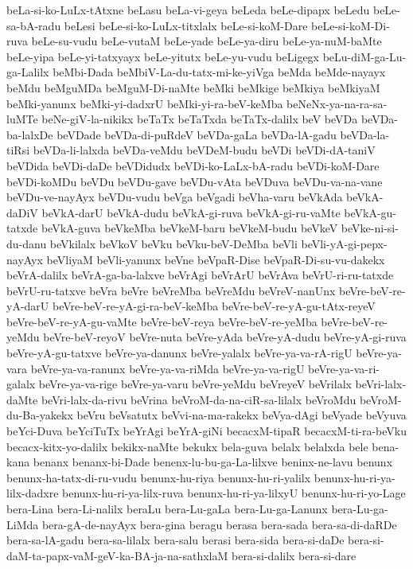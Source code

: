 {beLa-si-ko-LuLx-tAtxne
beLasu
beLa-vi-geya
beLeda
beLe-dipapx
beLedu
beLe-sa-bA-radu
beLesi
beLe-si-ko-LuLx-titxlalx
beLe-si-koM-Dare
beLe-si-koM-Di-ruva
beLe-su-vudu
beLe-vutaM
beLe-yade
beLe-ya-diru
beLe-ya-nuM-baMte
beLe-yipa
beLe-yi-tatxyayx
beLe-yitutx
beLe-yu-vudu
beLigegx
beLu-diM-ga-Lu-ga-Lalilx
beMbi-Dada
beMbiV-La-du-tatx-mi-ke-yiVga
beMda
beMde-nayayx
beMdu
beMguMDa
beMguM-Di-naMte
beMki
beMkige
beMkiya
beMkiyaM
beMki-yanunx
beMki-yi-dadxrU
beMki-yi-ra-beV-keMba
beNeNx-ya-na-ra-sa-luMTe
beNe-giV-la-nikikx
beTaTx
beTaTxda
beTaTx-dalilx
beV
beVDa
beVDa-ba-lalxDe
beVDade
beVDa-di-puRdeV
beVDa-gaLa
beVDa-lA-gadu
beVDa-la-tiRsi
beVDa-li-lalxda
beVDa-veMdu
beVDeM-budu
beVDi
beVDi-dA-taniV
beVDida
beVDi-daDe
beVDidudx
beVDi-ko-LaLx-bA-radu
beVDi-koM-Dare
beVDi-koMDu
beVDu
beVDu-gave
beVDu-vAta
beVDuva
beVDu-va-na-vane
beVDu-ve-nayAyx
beVDu-vudu
beVga
beVgadi
beVha-varu
beVkAda
beVkA-daDiV
beVkA-darU
beVkA-dudu
beVkA-gi-ruva
beVkA-gi-ru-vaMte
beVkA-gu-tatxde
beVkA-guva
beVkeMba
beVkeM-baru
beVkeM-budu
beVkeV
beVke-ni-si-du-danu
beVkilalx
beVkoV
beVku
beVku-beV-DeMba
beVli
beVli-yA-gi-pepx-nayAyx
beVliyaM
beVli-yanunx
beVne
beVpaR-Dise
beVpaR-Di-su-vu-dakekx
beVrA-dalilx
beVrA-ga-ba-lalxve
beVrAgi
beVrArU
beVrAva
beVrU-ri-ru-tatxde
beVrU-ru-tatxve
beVra
beVre
beVreMba
beVreMdu
beVreV-nanUnx
beVre-beV-re-yA-darU
beVre-beV-re-yA-gi-ra-beV-keMba
beVre-beV-re-yA-gu-tAtx-reyeV
beVre-beV-re-yA-gu-vaMte
beVre-beV-reya
beVre-beV-re-yeMba
beVre-beV-re-yeMdu
beVre-beV-reyoV
beVre-nuta
beVre-yAda
beVre-yA-dudu
beVre-yA-gi-ruva
beVre-yA-gu-tatxve
beVre-ya-danunx
beVre-yalalx
beVre-ya-va-rA-rigU
beVre-ya-vara
beVre-ya-va-ranunx
beVre-ya-va-riMda
beVre-ya-va-rigU
beVre-ya-va-ri-galalx
beVre-ya-va-rige
beVre-ya-varu
beVre-yeMdu
beVreyeV
beVrilalx
beVri-lalx-daMte
beVri-lalx-da-rivu
beVrina
beVroM-da-na-ciR-sa-lilalx
beVroMdu
beVroM-du-Ba-yakekx
beVru
beVsatutx
beVvi-na-ma-rakekx
beVya-dAgi
beVyade
beVyuva
beYci-Duva
beYciTuTx
beYrAgi
beYrA-giNi
becacxM-tipaR
becacxM-ti-ra-beVku
becacx-kitx-yo-dalilx
bekikx-naMte
bekukx
bela-guva
belalx
belalxda
bele
bena-kana
benanx
benanx-bi-Dade
benenx-lu-bu-ga-La-lilxve
beninx-ne-lavu
benunx
benunx-ha-tatx-di-ru-vudu
benunx-hu-riya
benunx-hu-ri-yalilx
benunx-hu-ri-ya-lilx-dadxre
benunx-hu-ri-ya-lilx-ruva
benunx-hu-ri-ya-lilxyU
benunx-hu-ri-yo-Lage
bera-Lina
bera-Li-nalilx
beraLu
bera-Lu-gaLa
bera-Lu-ga-Lanunx
bera-Lu-ga-LiMda
bera-gA-de-nayAyx
bera-gina
beragu
berasa
bera-sada
bera-sa-di-daRDe
bera-sa-lA-gadu
bera-sa-lilalx
bera-salu
berasi
bera-sida
bera-si-daDe
bera-si-daM-ta-papx-vaM-geV-ka-BA-ja-na-sathxlaM
bera-si-dalilx
bera-si-dare
}
